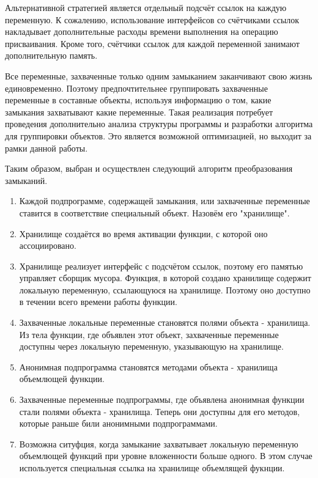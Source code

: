 \documentclass{imcs}
\begin{document}
Альтернативной стратегией является отдельный подсчёт ссылок на каждую переменную. К сожалению, использование
интерфейсов со счётчиками ссылок накладывает дополнительные расходы времени выполнения на операцию
присваивания. Кроме того, счётчики ссылок для каждой переменной занимают дополнительную память.

Все переменные, захваченные только одним замыканием заканчивают свою жизнь единовременно.
Поэтому предпочтительнее группировать захваченные переменные в составные объекты, используя информацию о том,
какие замыкания захватывают какие переменные. Такая реализация потребует проведения дополнительно
анализа структуры программы и разработки алгоритма для группировки объектов. Это является возможной оптимизацией,
но выходит за рамки данной работы.

Таким образом, выбран и осуществлен следующий алгоритм преобразования замыканий.

\begin{enumerate}
    \item Каждой подпрограмме, содержащей замыкания, или захваченные переменные ставится в соответствие специальный объект. Назовём его "хранилище".
    \item Хранилище создаётся во время активации функции, с которой оно ассоциировано. 
    \item Хранилище реализует интерфейс с подсчётом ссылок, поэтому его памятью управляет сборщик мусора. Функция, в которой создано хранилище содержит локальную переменную, ссылающуюся на хранилище. Поэтому оно доступно в течении всего времени работы функции.
    \item Захваченные локальные переменные становятся полями объекта - хранилища. Из тела функции, где объявлен этот объект, захваченные переменные доступны через локальную переменную, указывающую на хранилище.
    \item Анонимная подпрограмма становятся методами объекта - хранилища объемлющей функции.
    \item Захваченные переменные подпрограммы, где объявлена анонимная функции стали полями объекта - хранилища.
Теперь они доступны для его методов, которые раньше били анонимными подпрограммами.
    \item Возможна ситуфция, когда замыкание захватывает локальную переменную объемлющей функций
 при уровне вложенности больше одного. В этом случае используется специальная ссылка на хранилище
 объемлящей фукнции.
\end{enumerate}
\end{document}
